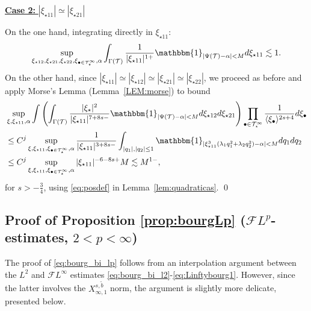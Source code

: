 \documentclass[a4paper,
11pt,  reqno]{amsart}
\newcommand{\5}{\textup{V}}
\newcommand{\noi}{\noindent}
\newcommand{\FL}{\mathcal{F} L}
\newcommand{\wt}{\widetilde}
\theoremstyle{remark}
\newcommand{\bul}{\bullet}
\newcommand{\TT}{\mathcal{T}}
\newcommand{\G}{\Gamma}
\newcommand{\ld}{\lambda}
\newcommand{\jb}[1]
{\langle #1 \rangle}
\numberwithin{equation}{section}
\numberwithin{theorem}{section}
\begin{document}
\smallskip
\noi
\underline{\textbf{Case 2:} $|\xi_{\star11}| \simeq |\xi_{\star21}|$}


 On the one hand, integrating directly in $\xi_{\star11}$:
\begin{align*}
\sup_{\xi_{\star12}, \xi_{\star21}, \xi_{\star22},  \xi_{\bul\in \TT^\infty_\star},\alpha} \int_{\G(\TT)}\frac{1}{|\xi_{\star11}|^{1+}}\mathbbm{1}_{|\Psi(\TT)-\alpha|<M} d\xi_{\star11} \lesssim 1
.
\end{align*}
On the other hand, since $|\xi_{\star11}| \simeq |\xi_{\star12}|\simeq |\xi_{\star21}|\simeq |\xi_{\star22}|$,
we proceed as before and apply Morse's Lemma (Lemma~\ref{LEM:morse}) to bound
\begin{align}
&
\sup_{\xi, \xi_{\star11},\alpha}
\int \left(\int_{\G(\TT)} \frac{|\xi_\star|^2}{|\xi_{\star11}|^{7+8s - }}\mathbbm{1}_{|\Psi(\TT)-\alpha|<M} d\xi_{\star12} d\xi_{\star21} \right)
\prod_{\bul\in \TT^\infty_\star} \frac{1}{\jb{\xi_{\bul}}^{2s+4}} d\xi_\bul
\\
&
\le C^j
\sup_{\xi, \xi_{\star11}, \xi_{\bul\in \TT^\infty_\star},\alpha}
\frac{1}{|\xi_{\star11}|^{3+8s - }}
\int_{|q_1|, |q_2| \le 1} \mathbbm{1}_{|\xi_{\star11}^3(\ld_{1} q_1^2 + \ld_2 q_2^2)-\alpha|<M} dq_1 dq_2\label{eq:L2_44}
\\
&
\le C^j
\sup_{\xi, \xi_{\star11}, \xi_{\bul\in \TT^\infty_\star},\alpha} |\xi_{\star11}|^{-6-8s+}M \lesssim M^{1-},
\end{align}
for $s>-\frac34$, using \eqref{eq:posdef} in Lemma~\ref{lem:quadraticas}.
\qed

\subsection{Proof of Proposition \ref{prop:bourgLp} ($\FL^p$-estimates, $2<p<\infty$)}
\label{SUBSEC:bourgainLp}



The proof of \eqref{eq:bourg_bi_lp} follows from an interpolation argument between the $L^2$ and $\FL^\infty$ estimates \eqref{eq:bourg_bi_l2}-\eqref{eq:Linftybourg1}. However, since the latter involves the $X_{\infty,1}^{s,\wt{b}}$ norm, the argument is slightly more delicate, presented below.
\end{document}
